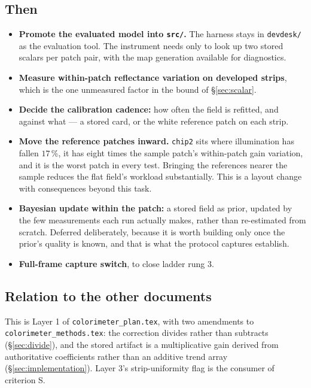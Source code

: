 \documentclass[11pt, a4paper]{article}
\newcommand{\code}[1]{\texttt{#1}}
\newcommand{\pct}{\,\%}
\begin{document}
\subsection{Then}

\begin{itemize}[nosep]
  \item \textbf{Promote the evaluated model into \code{src/}.}
        The harness stays in \code{devdesk/} as the evaluation tool.
        The instrument needs only to look up two stored scalars
        per patch pair,
        with the map generation available for diagnostics.
  \item \textbf{Measure within-patch reflectance variation on developed
        strips},
        which is the one unmeasured factor
        in the bound of \S\ref{sec:scalar}.
  \item \textbf{Decide the calibration cadence:}
        how often the field is refitted, and against what ---
        a stored card, or the white reference patch on each strip.
  \item \textbf{Move the reference patches inward.}
        \code{chip2} sits where illumination has fallen $17\pct$,
        it has eight times the sample patch's within-patch gain variation,
        and it is the worst patch in every test.
        Bringing the references nearer the sample
        reduces the flat field's workload substantially.
        This is a layout change with consequences beyond this task.
  \item \textbf{Bayesian update within the patch:}
        a stored field as prior,
        updated by the few measurements each run actually makes,
        rather than re-estimated from scratch.
        Deferred deliberately,
        because it is worth building only once the prior's quality
        is known,
        and that is what the protocol captures establish.
  \item \textbf{Full-frame capture switch}, to close ladder rung 3.
\end{itemize}

\subsection{Relation to the other documents}

This is Layer 1 of \code{colorimeter\_plan.tex},
with two amendments to \code{colorimeter\_methods.tex}:
the correction divides rather than subtracts (\S\ref{sec:divide}),
and the stored artifact is a multiplicative gain
derived from authoritative coefficients
rather than an additive trend array (\S\ref{sec:implementation}).
Layer 3's strip-uniformity flag is the consumer of criterion S.
\end{document}
